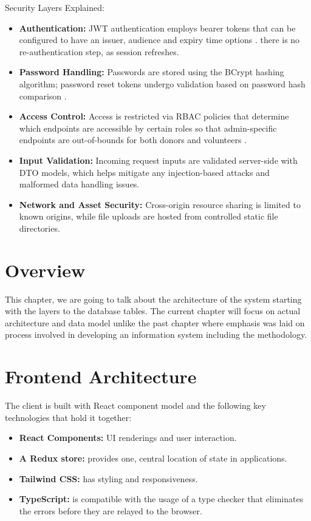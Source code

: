\documentclass{thesis-library}
\begin{document}
Security Layers Explained:
\begin{itemize}
    \item \textbf{Authentication:} JWT authentication employs bearer tokens that can be configured to have an issuer, audience and expiry time options \cite{jones2015jwt}. there is no re-authentication step, as session refreshes.
    \item \textbf{Password Handling:} Passwords are stored using the BCrypt hashing algorithm; password reset tokens undergo validation based on password hash comparison \cite{provos1999bcrypt}.
    \item \textbf{Access Control:} Access is restricted via RBAC policies that determine which endpoints are accessible by certain roles so that admin-specific endpoints are out-of-bounds for both donors and volunteers \cite{sandhu1996rbac}.
    \item \textbf{Input Validation:} Incoming request inputs are validated server-side with DTO models, which helps mitigate any injection-based attacks and malformed data handling issues.
    \item \textbf{Network and Asset Security:} Cross-origin resource sharing is limited to known origins, while file uploads are hosted from controlled static file directories.
\end{itemize}

\section{Overview}
This chapter, we are going to talk about the architecture of the system starting with the layers to the database tables. The current chapter will focus on actual architecture and data model unlike the past chapter where emphasis was laid on process involved in developing an information system including the methodology.

\section{Frontend Architecture}
The client is built with React component model and the following key technologies that hold it together:
\begin{itemize}
    \item \textbf{React Components:} UI renderings and user interaction.
    \item \textbf{A Redux store:} provides one, central location of state in applications.
    \item \textbf{Tailwind CSS:} has styling and responsiveness.
    \item \textbf{TypeScript:} is compatible with the usage of a type checker that eliminates the errors before they are relayed to the browser.
\end{itemize}
\end{document}
